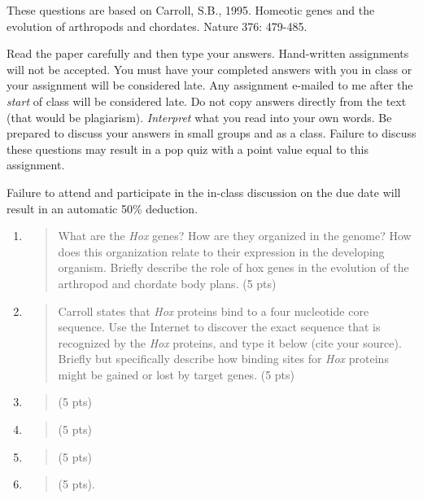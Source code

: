 These questions are based on Carroll, S.B., 1995. Homeotic genes and the
evolution of arthropods and chordates. Nature 376: 479-485.

Read the paper carefully and then type your answers. Hand-written
assignments will not be accepted. You must have your completed answers
with you in class or your assignment will be considered late. Any
assignment e-mailed to me after the \emph{start} of class will be
considered late. Do not copy answers directly from the text (that would
be plagiarism). \emph{Interpret} what you read into your own words. Be
prepared to discuss your answers in small groups and as a class. Failure
to discuss these questions may result in a pop quiz with a point value
equal to this assignment.

Failure to attend and participate in the in-class discussion on the due
date will result in an automatic 50\% deduction.

\begin{enumerate}
\def\labelenumi{\arabic{enumi}.}
\item
  \begin{quote}
  What are the \emph{Hox} genes? How are they organized in the genome?
  How does this organization relate to their expression in the
  developing organism. Briefly describe the role of hox genes in the
  evolution of the arthropod and chordate body plans. (5 pts)
  \end{quote}
\item
  \begin{quote}
  Carroll states that \emph{Hox} proteins bind to a four nucleotide core
  sequence. Use the Internet to discover the exact sequence that is
  recognized by the \emph{Hox} proteins, and type it below (cite your
  source). Briefly but specifically describe how binding sites for
  \emph{Hox} proteins might be gained or lost by target genes. (5 pts)
  \end{quote}

\item
  \begin{quote}
  (5 pts)
  \end{quote}

\item
  \begin{quote}
  
  (5 pts)
  \end{quote}
\item
  \begin{quote}
   (5 pts)
  \end{quote}
\item
  \begin{quote}
  (5 pts).
  \end{quote}
\end{enumerate}
